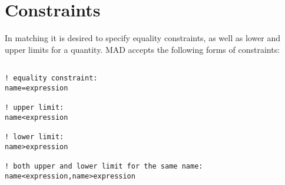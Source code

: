 
\section{Constraints}

In matching it is desired to specify equality constraints, as well as
lower and upper limits for a quantity. MAD accepts the following forms
of constraints:  

\begin{verbatim}

! equality constraint:
name=expression

! upper limit:
name<expression

! lower limit:
name>expression

! both upper and lower limit for the same name:
name<expression,name>expression
\end{verbatim}



